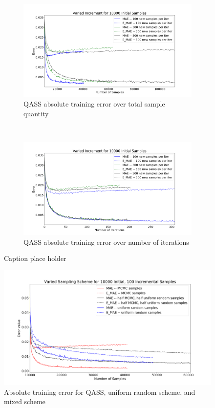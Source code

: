 \begin{figure}[h]
    \centering
    \begin{subfigure}[t]{0.5\textwidth}
        \centering
        \includegraphics[width=1.1\linewidth]{fig5_qassincrsamp.png}
        \caption{QASS absolute training error over total sample quantity}
    \end{subfigure}%
    ~ 
    \begin{subfigure}[t]{0.5\textwidth}
        \centering
        \includegraphics[width=1.1\linewidth]{fig6_qassincrtime.png}
        \caption{QASS absolute training error over number of iterations}
    \end{subfigure}
    \caption{Caption place holder}
\end{figure}

\begin{figure}[h]
  \centering
    \includegraphics[width=0.8\linewidth]{fig7_qasssampling.png}
    \caption{Absolute training error for QASS, uniform random scheme, and mixed scheme}
  \label{fig:pca}
\end{figure}
